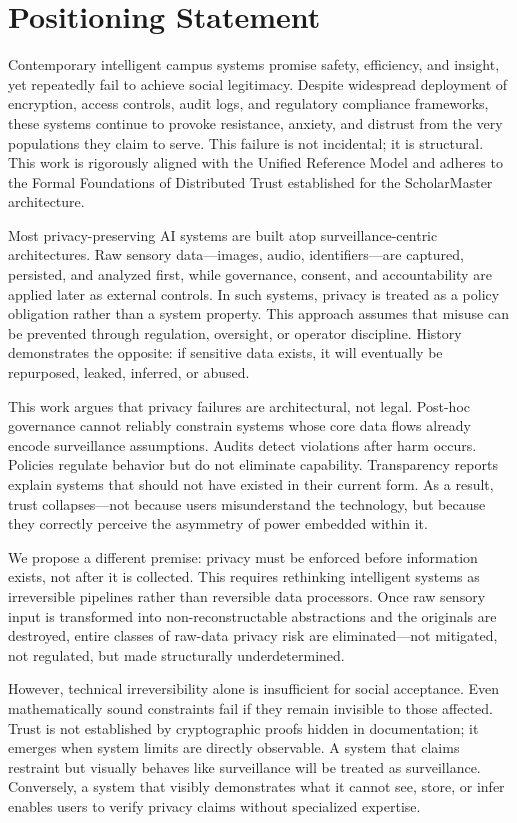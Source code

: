 \documentclass[conference]{IEEEtran}
\begin{document}
\section*{Positioning Statement}
Contemporary intelligent campus systems promise safety, efficiency, and insight, yet repeatedly fail to achieve social legitimacy. Despite widespread deployment of encryption, access controls, audit logs, and regulatory compliance frameworks, these systems continue to provoke resistance, anxiety, and distrust from the very populations they claim to serve. This failure is not incidental; it is structural. This work is rigorously aligned with the Unified Reference Model \cite{P20} and adheres to the Formal Foundations of Distributed Trust \cite{P21} established for the ScholarMaster architecture.

Most privacy-preserving AI systems are built atop surveillance-centric architectures. Raw sensory data---images, audio, identifiers---are captured, persisted, and analyzed first, while governance, consent, and accountability are applied later as external controls. In such systems, privacy is treated as a policy obligation rather than a system property. This approach assumes that misuse can be prevented through regulation, oversight, or operator discipline. History demonstrates the opposite: if sensitive data exists, it will eventually be repurposed, leaked, inferred, or abused.

This work argues that privacy failures are architectural, not legal. Post-hoc governance cannot reliably constrain systems whose core data flows already encode surveillance assumptions. Audits detect violations after harm occurs. Policies regulate behavior but do not eliminate capability. Transparency reports explain systems that should not have existed in their current form. As a result, trust collapses---not because users misunderstand the technology, but because they correctly perceive the asymmetry of power embedded within it.

We propose a different premise: privacy must be enforced before information exists, not after it is collected. This requires rethinking intelligent systems as irreversible pipelines rather than reversible data processors. Once raw sensory input is transformed into non-reconstructable abstractions and the originals are destroyed, entire classes of raw-data privacy risk are eliminated---not mitigated, not regulated, but made structurally underdetermined.

However, technical irreversibility alone is insufficient for social acceptance. Even mathematically sound constraints fail if they remain invisible to those affected. Trust is not established by cryptographic proofs hidden in documentation; it emerges when system limits are directly observable. A system that claims restraint but visually behaves like surveillance will be treated as surveillance. Conversely, a system that visibly demonstrates what it cannot see, store, or infer enables users to verify privacy claims without specialized expertise.
\end{document}
